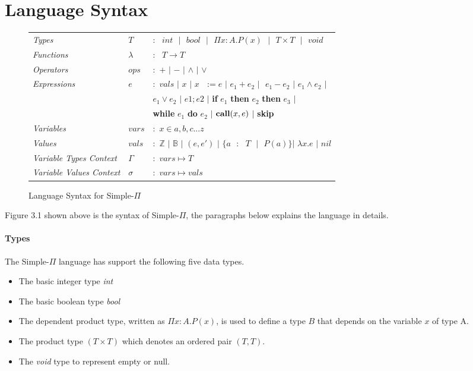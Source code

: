 \documentclass[a4paper,12pt]{report}
\begin{document}
\section{Language Syntax}
\begin{figure}[H]
  \begin{center}
    \begin{tabular}{l l l}
      \textit{Types} & $T$ & $:\text{ }int\text{ }|\text{ }bool\text{ }|\text{ }\Pi x: A.P(x)
      \text{ }|\text{ }T \times T\text{ }|\text{ }void$\\
      \textit{Functions} & $\lambda$ & $:\text{ }T\longrightarrow T$\\
      \textit{Operators} & $ops$ & $:$ $+$ $|$ $-$ $|$ $\wedge$ $|$ $\vee$ \\
      \textit{Expressions} & $e$ & $:$ $vals$ $|$ $x$ $|$ $x\text{ }:= e$ $|$ 
      $e_1 + e_2$ $| \text{ }e_1 - e_2$ $|$ $e_1 \wedge e_2$ $|$ \\ 
      & & \; $e_1 \vee e_2$ $|$ $e1;e2$ $|$ \textbf{if} $e_1$ \textbf{then} $e_2$ \textbf{then} $e_3$ $|$\\
      & & \;  \textbf{while} $e_1$ \textbf{do} $e_2$ $|$ 
      $\text{\textbf{call}}(x, e)$ $|$ \textbf{skip}\\
      \textit{Variables} & $vars$& $:$ $x \in {a,b,c...z}$\\
      \textit{Values} & $vals$& $:$ $\mathbb{Z}$ $|$ $\mathbb{B}$ $|$ $(e, e')$ $|$ $\{a\text{ }:
      \text{ }T\text{ }|\text{ } P(a)\}$\text{ }$|$ $\lambda x.e$ $|$ $nil$\\
      \textit{Variable Types Context} & $\Gamma$& $:$ $vars \mapsto T$\\
      \textit{Variable Values Context} & $\sigma$& $:$ $vars \mapsto vals$
    \end{tabular}
  \end{center}
  \caption{Language Syntax for Simple-$\Pi$}
\end{figure}

\par
Figure 3.1 shown above is the syntax of Simple-$\Pi$, the paragraphs below 
explains the language in details.

\paragraph{Types} The Simple-$\Pi$ language has support the following five data types. 
\begin{itemize}
  \item The basic integer type \textit{int}
  \item The basic boolean type \textit{bool}
  \item The dependent product type, written as $\Pi x: A.P(x)$, is used to 
  define a type $B$ that depends on the variable $x$ of type A.
  \item The product type $(T \times T)$ which denotes an ordered pair $(T, T)$.
  \item The \textit{void} type to represent empty or null.
\end{itemize}
\end{document}
